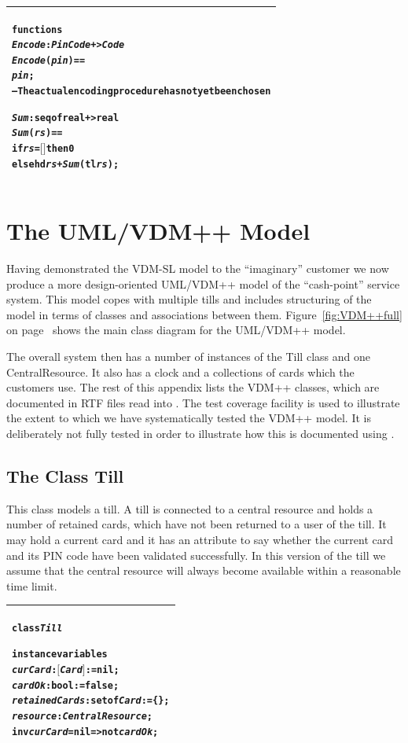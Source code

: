 \documentclass[\pformat,12pt,twoside]{article}
\newenvironment{VDMgray}%
{\begin{tabular}{|G|}\hline\small\begin{alltt}}%
{\end{alltt}\normalsize\\
 \hline\end{tabular}}
\begin{document}
\begin{VDMgray}
\textbf{functions}
 \textit{Encode}: \textit{PinCode} +\texttt{>} \textit{Code}
 \textit{Encode}(\textit{pin}) ==
   \textit{pin};
   -- The actual encoding procedure has not yet been chosen

 \textit{Sum}: \textbf{seq} \textbf{of} \textbf{real} +\texttt{>} \textbf{real}
 \textit{Sum}(\textit{rs}) ==
 \textbf{if} \textit{rs} = \ensuremath{[}\ensuremath{]} \textbf{then} 0
 \textbf{else} \textbf{hd} \textit{rs} + \textit{Sum}(\textbf{tl} \textit{rs});
\end{VDMgray}

\newpage
\section{The UML/VDM++ Model}\label{app:VDMPP}

Having demonstrated the VDM-SL model to the ``imaginary'' customer we
now produce a more design-oriented UML/VDM++ model of the
``cash-point'' service system. This model copes with multiple tills
and includes structuring of the model in terms of classes and
associations between them. Figure~\ref{fig:VDM++full} on
page~\pageref{fig:VDM++full} shows the main
class diagram for the UML/VDM++ model.

The overall system then has a number of instances of the Till 
class and one CentralResource. It also has a clock 
and a collections of cards which the customers use. The rest 
of this appendix lists the VDM++ classes, which are documented 
in RTF files read into \vdmtools. The test coverage 
facility is used to illustrate the extent to which we have systematically 
tested the VDM++ model. It is deliberately not fully tested in 
order to illustrate how this is documented using
\vdmtools. 

\subsection{The Class Till}

This class models a till. A till is connected to a central resource 
and holds a number of retained cards, which have not been returned 
to a user of the till. It may hold a current card and it has 
an attribute to say whether the current card and its PIN code 
have been validated successfully. In this version of the till 
we assume that the central resource will always become available 
within a reasonable time limit.

\begin{VDMgray}
\textbf{class} \textit{Till}

\textbf{instance} \textbf{variables}
 \textit{curCard} : \ensuremath{[}\textit{Card}\ensuremath{]} := \textbf{nil};
 \textit{cardOk} : \textbf{bool} := \textbf{false};
 \textit{retainedCards} : \textbf{set} \textbf{of} \textit{Card} := \{\};
 \textit{resource} : \textit{CentralResource};
 \textbf{inv} \textit{curCard} = \textbf{nil} =\texttt{>} \textbf{not} \textit{cardOk};
\end{VDMgray}
\end{document}
